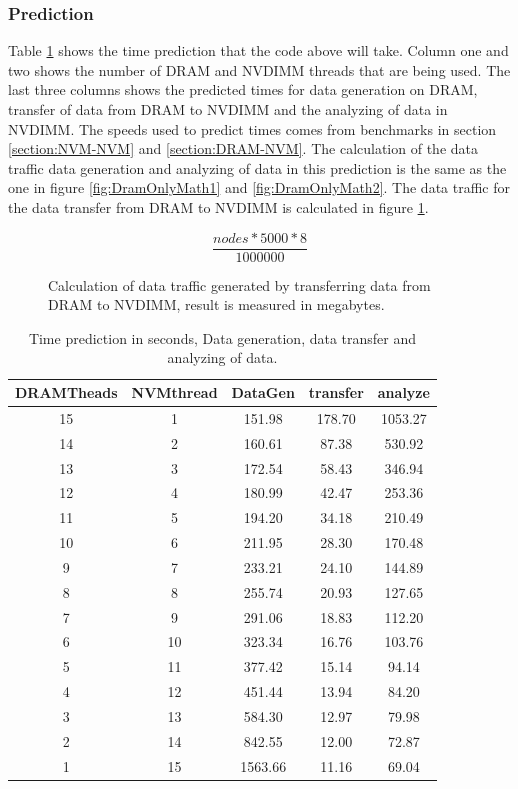 \documentclass[12pt,a4paper,USenglish]{article}      %
\begin{document}
\subsubsection{Prediction}
Table \ref{tab:nvmPredictions} shows the time prediction that the code above will take. Column one and two shows the number of DRAM and NVDIMM threads that are being used. The last three columns shows the predicted times for data generation on DRAM, transfer of data from DRAM to NVDIMM and the analyzing of data in NVDIMM. The speeds used to predict times comes from benchmarks in section \ref{section:NVM-NVM} and \ref{section:DRAM-NVM}. The calculation of the data traffic data generation and analyzing of data in this prediction is the same as the one in figure \ref{fig:DramOnlyMath1} and \ref{fig:DramOnlyMath2}. The data traffic for the data transfer from DRAM to NVDIMM is calculated in figure \ref{fig:DramOnlyMath3}.
\begin{figure}
\[
	\frac{nodes*5000*8}{1000000}
\]
\caption{Calculation of data traffic generated by transferring data from DRAM to NVDIMM, result is measured in megabytes.}
\label{fig:DramOnlyMath3}
\end{figure}
\begin{table}[!hbtp]
\begin{tabular}{ |c|c|c|c|c| } 
\hline
DRAMTheads & NVMthread & DataGen & transfer & analyze \\
\hline
15 & 1 & 151.98 & 178.70 & 1053.27 \\
\hline
14 & 2 & 160.61 & 87.38 & 530.92 \\
\hline
13 & 3 & 172.54 & 58.43 & 346.94 \\
\hline
12 & 4 & 180.99 & 42.47 & 253.36 \\
\hline
11 & 5 & 194.20 & 34.18 & 210.49 \\
\hline
10 & 6 & 211.95 & 28.30 & 170.48 \\
\hline
9 & 7 & 233.21 & 24.10 & 144.89 \\
\hline
8 & 8 & 255.74 & 20.93 & 127.65 \\
\hline
7 & 9 & 291.06 & 18.83 & 112.20 \\
\hline
6 & 10 & 323.34 & 16.76 & 103.76 \\
\hline
5 & 11 & 377.42 & 15.14 & 94.14 \\
\hline
4 & 12 & 451.44 & 13.94 & 84.20 \\
\hline
3 & 13 & 584.30 & 12.97 & 79.98 \\
\hline
2 & 14 & 842.55 & 12.00 & 72.87 \\
\hline
1 & 15 & 1563.66 & 11.16 & 69.04 \\
\hline
\end{tabular}
\caption{Time prediction in seconds, Data generation, data transfer and analyzing of data.}
\label{tab:nvmPredictions}
\end{table}
\end{document}
